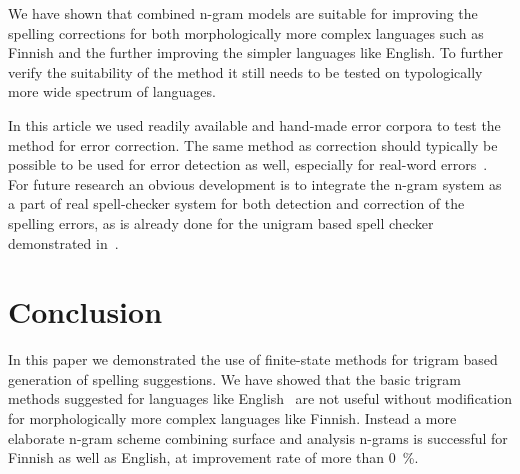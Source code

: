 \documentclass{llncs}
\begin{document}
We have shown that combined n-gram models are suitable for improving the
spelling corrections for both morphologically more complex languages such as
Finnish and the further improving the simpler languages like English. To
further verify the suitability of the method it still needs to be tested on
typologically more wide spectrum of languages.

In this article we used readily available and hand-made error corpora to test
the method for error correction. The same method as correction should typically
be possible to be used for error detection as well, especially for real-word
errors~\cite{mays/1991}. For future research an obvious development is to
integrate the n-gram system as a part of real spell-checker system for both
detection and correction of the spelling errors, as is already done for the
unigram based spell checker demonstrated in~\cite{pirinen/2010/lrec}.

\section{Conclusion}

In this paper we demonstrated the use of finite-state methods for trigram based
generation of spelling suggestions. We have showed that the basic trigram
methods suggested for languages like English~\cite{wilcox-ohearn/2008} are not
useful without modification for morphologically more complex languages like
Finnish.  Instead a more elaborate n-gram scheme combining surface and analysis
n-grams is successful for Finnish as well as English, at improvement rate of
more than 0~\%.





\end{document}
